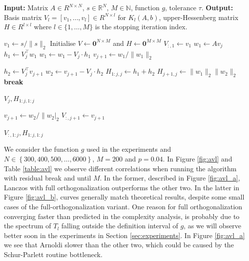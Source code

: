 \documentclass[11pt]{article}
\renewcommand{\mathbb}[1]{\mathds{#1}}
\newcommand{\R}{\mathbb{R}}
\newcommand{\N}{\mathbb{N}}
\theoremstyle{definition}
\theoremstyle{remark}
\theoremstyle{experimental}
\begin{document}
\begin{algorithm}[ht!]
  \caption{Arnoldi with double orthogonalization.}
  \label{alg:arnoldi_double_ortho}
  \begin{algorithmic}[1]
  \State \textbf{Input:} Matrix $ A \in R^{N\times N} $, $ s \in \R^N $, $ M \in \N$, function $
    g $, tolerance $ \tau $.
  \State \textbf{Output: } Basis matrix $ V_l = \left[ v_1,\dots,v_l \right] \in R^{N \times l} $
  for $ K_l(A,b) $, upper-Hessenberg matrix $ H \in R^{l \times l} $ where $ l \in
    \{ 1,\dots,M \}$ is the stopping iteration index.

    \State $ v_1 \leftarrow s / \|s\|_2 $
    \State Initialise $ V \leftarrow \mathbf{0}^{N \times M} $ and $ H \leftarrow
    \mathbf{0}^{M \times M} $
    \State $ V_{:, 1} \leftarrow v_1 $
        \State $ w_1 \leftarrow A v_j $
        \State {}
        \State $ h_1 \leftarrow V_j^\top w_1 $
        \State $ w_1 \leftarrow w_1 - V_j \cdot h_1 $
        \State $ v_{j+1} \leftarrow w_1 / \|w_1\|_2 $ 
        
        \State {}
        \State $ h_2 \leftarrow V_j^\top v_{j+1} $
        \State $ w_2 \leftarrow v_{j+1} - V_j \cdot h_2 $
        \State $ H_{1:j, j} \leftarrow h_1 + h_2 $
        \State $ H_{j+1, j} \leftarrow \|w_1\|_2 \|w_2\|_2 $\\
        
            \State \textbf{break} 
        \EndIf
        
        \State {}
                \State \Return $ V_j, H_{1:j, 1:j} $
            \EndIf
        \EndIf
        
        \State $ v_{j+1} \leftarrow w_2 / \|w_2|_2 $
        \State $ V_{:, j+1} \leftarrow v_{j+1} $
    \EndFor
    
    \State \Return $ V_{:, 1:j}, H_{1:j, 1:j}$
  \end{algorithmic}
\end{algorithm}

We consider the function $ g $ used in the experiments and $ N \in \left\{ 300, 400,
500, \dots, 6000\right\} $, $ M = 200 $ and $ p = 0.04 $. 
In Figure \ref{fig:avl} and Table \ref{table:avl} we observe different correlations when running
the algorithm with residual break and until $ M $. In the former, described in Figure \ref{fig:avl_a}, Lanczos
with full orthogonalization outperforms the other two. In the latter in Figure
\ref{fig:avl_b}, curves generally match theoretical results, despite some small cases of the
full-orthogonalization variant.
One reason for full orthogonalization converging faster than predicted in the complexity analysis,
is probably due to the spectrum of $ T_l $ falling outside the definition interval of $ g $, as we will
observe better soon in the experiments in Section \ref{sec:experiments}. In Figure \ref{fig:avl_a}
we see that Arnoldi slower than the other two, which could be caused by the Schur-Parlett routine bottleneck.
\end{document}
